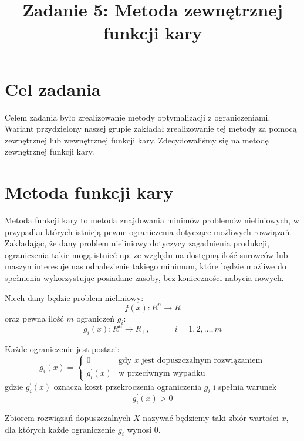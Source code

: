 \documentclass{classrep}
\author{%
  \studentinfo{Michał Janiszewski}{169485} \and
  \studentinfo{Leszek Wach}{169513}
}
\title{Zadanie 5: Metoda zewnętrznej funkcji kary}
\begin{document}
\maketitle

\section{Cel zadania}
Celem zadania było zrealizowanie metody optymalizacji z ograniczeniami. Wariant przydzielony naszej grupie zakładał zrealizowanie tej metody za pomocą zewnętrznej lub wewnętrznej funkcji kary. Zdecydowaliśmy się na metodę zewnętrznej funkcji kary.

\section{Metoda funkcji kary}
Metoda funkcji kary to metoda znajdowania minimów problemów nieliniowych, w przypadku których istnieją pewne ograniczenia dotyczące możliwych rozwiązań. Zakładając, że dany problem nieliniowy dotyczycy zagadnienia produkcji, ograniczenia takie mogą istnieć np. ze względu na dostępną ilość surowców lub maszyn \ppauza interesuje nas odnalezienie takiego minimum, które będzie możliwe do spełnienia wykorzystując posiadane zasoby, bez konieczności nabycia nowych.

Niech dany będzie problem nieliniowy:
\begin{equation}
f(x) : R^n \rightarrow R 
\end{equation}
oraz pewna ilość $m$ ograniczeń $g_i$:
\begin{equation}
 g_i(x) : R^n \rightarrow R_{+}, \hspace{3em} i = 1, 2, \ldots, m
\end{equation}

Każde ograniczenie jest postaci:
\begin{equation}
 g_i(x) = \begin{cases} 0 &\mbox{gdy $x$ jest dopuszczalnym rozwiązaniem} \\
	  g^{'}_i(x) & \mbox{w przeciwnym wypadku}\end{cases}
\end{equation}
gdzie $g^{'}_i(x)$ oznacza koszt przekroczenia ograniczenia $g_i$ i spełnia warunek
\begin{equation}
 g^{'}_i(x) > 0
\end{equation}

Zbiorem rozwiązań dopuszczalnych $X$ nazywać będziemy taki zbiór wartości $x$, dla których każde ograniczenie $g_i$ wynosi 0.
\end{document}
